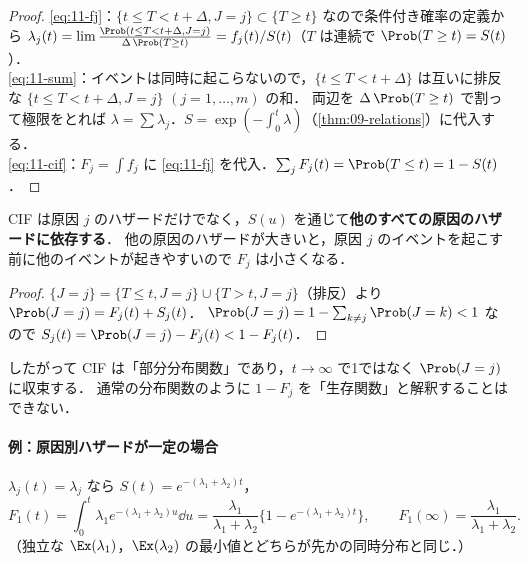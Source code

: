 \begin{proof}
\cref{eq:11-fj}：$\{t\le T<t+\Delta,J=j\}\subset\{T\ge t\}$ なので条件付き確率の定義から
$\lambda_j(t)=\lim\frac{\Prob(t\le T<t+\Delta,J=j)}{\Delta\,\Prob(T\ge t)}=f_j(t)/S(t)$（$T$ は連続で $\Prob(T\ge t)=S(t)$）．\\
\cref{eq:11-sum}：イベントは同時に起こらないので，$\{t\le T<t+\Delta\}$ は互いに排反な $\{t\le T<t+\Delta,J=j\}$ $(j=1,\dots,m)$ の和．
両辺を $\Delta\,\Prob(T\ge t)$ で割って極限をとれば $\lambda=\sum\lambda_j$．$S=\exp(-\int_0^t\lambda)$（\cref{thm:09-relations}）に代入する．\\
\cref{eq:11-cif}：$F_j=\int f_j$ に \cref{eq:11-fj} を代入．$\sum_jF_j(t)=\Prob(T\le t)=1-S(t)$．
\end{proof}
CIF は原因 $j$ のハザードだけでなく，$S(u)$ を通じて\textbf{他のすべての原因のハザードに依存する}．
他の原因のハザードが大きいと，原因 $j$ のイベントを起こす前に他のイベントが起きやすいので $F_j$ は小さくなる．

\begin{proof}
$\{J=j\}=\{T\le t,J=j\}\cup\{T>t,J=j\}$（排反）より $\Prob(J=j)=F_j(t)+S_j(t)$．
$\Prob(J=j)=1-\sum_{k\ne j}\Prob(J=k)<1$ なので $S_j(t)=\Prob(J=j)-F_j(t)<1-F_j(t)$．
\end{proof}
したがって CIF は「部分分布関数」であり，$t\to\infty$ で1ではなく $\Prob(J=j)$ に収束する．
通常の分布関数のように $1-F_j$ を「生存関数」と解釈することはできない．

\paragraph{例：原因別ハザードが一定の場合}
$\lambda_j(t)=\lambda_j$ なら $S(t)=e^{-(\lambda_1+\lambda_2)t}$，
\[
F_1(t)=\int_0^t\lambda_1e^{-(\lambda_1+\lambda_2)u}\dd u=\frac{\lambda_1}{\lambda_1+\lambda_2}\bigl\{1-e^{-(\lambda_1+\lambda_2)t}\bigr\},\qquad F_1(\infty)=\frac{\lambda_1}{\lambda_1+\lambda_2}.
\]
（独立な $\Ex(\lambda_1)$，$\Ex(\lambda_2)$ の最小値とどちらが先かの同時分布と同じ．）
